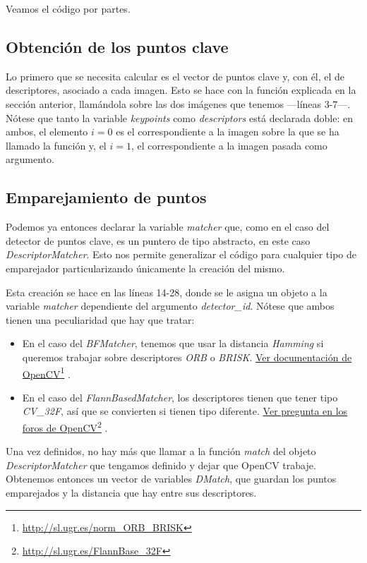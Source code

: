 \documentclass[a4paper, 11pt]{article}
\newcommand\fnurl[2]{%
  \href{#2}{#1}\footnote{\url{#2}}%
}
\theoremstyle{definition}
\theoremstyle{theorem}
\begin{document}
  Veamos el código por partes.

  \subsection{Obtención de los puntos clave}
  Lo primero que se necesita calcular es el vector de puntos clave y, con él, el de descriptores, asociado a cada imagen. Esto se hace con la función explicada en la sección anterior, llamándola sobre las dos imágenes que tenemos ---líneas 3-7---. Nótese que tanto la variable \emph{keypoints} como \emph{descriptors} está declarada doble: en ambos, el elemento $i=0$ es el correspondiente a la imagen sobre la que se ha llamado la función y, el $i=1$, el correspondiente a la imagen pasada como argumento.

  \subsection{Emparejamiento de puntos}
  Podemos ya entonces declarar la variable \emph{matcher} que, como en el caso del detector de puntos clave, es un puntero de tipo abstracto, en este caso \emph{DescriptorMatcher}. Esto nos permite generalizar el código para cualquier tipo de emparejador particularizando únicamente la creación del mismo.

  Esta creación se hace en las líneas 14-28, donde se le asigna un objeto a la variable \emph{matcher} dependiente del argumento \emph{detector\_id}. Nótese que ambos tienen una peculiaridad que hay que tratar:
  \begin{itemize}
      \item En el caso del \emph{BFMatcher}, tenemos que usar la distancia \emph{Hamming} si queremos trabajar sobre descriptores \emph{ORB} o \emph{BRISK}. \fnurl{Ver documentación de OpenCV}{http://sl.ugr.es/norm_ORB_BRISK}.
      \item En el caso del \emph{FlannBasedMatcher}, los descriptores tienen que tener tipo \emph{CV\_32F}, así que se convierten si tienen tipo diferente. \fnurl{Ver pregunta en los foros de OpenCV}{http://sl.ugr.es/FlannBase_32F}.
  \end{itemize}

  Una vez definidos, no hay más que llamar a la función \emph{match} del objeto \emph{DescriptorMatcher} que tengamos definido y dejar que OpenCV trabaje. Obtenemos entonces un vector de variables \emph{DMatch}, que guardan los puntos emparejados y la distancia que hay entre sus descriptores.
\end{document}
